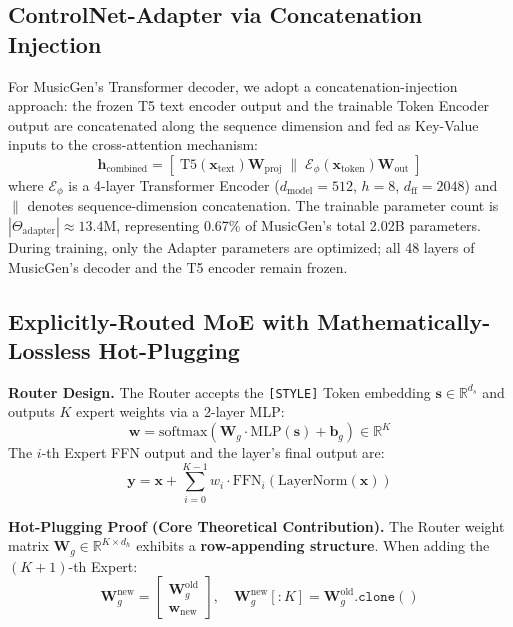 \documentclass[conference]{IEEEtran}
\begin{document}
\subsection{ControlNet-Adapter via Concatenation Injection}

For MusicGen's Transformer decoder, we adopt a concatenation-injection approach: the frozen T5 text encoder output and the trainable Token Encoder output are concatenated along the sequence dimension and fed as Key-Value inputs to the cross-attention mechanism:
\begin{equation}
\mathbf{h}_{\text{combined}} = [\;\text{T5}(\mathbf{x}_{\text{text}})\mathbf{W}_{\text{proj}}\;\|\;
\mathcal{E}_{\phi}(\mathbf{x}_{\text{token}})\mathbf{W}_{\text{out}}\;]
\end{equation}
where $\mathcal{E}_{\phi}$ is a 4-layer Transformer Encoder ($d_{\text{model}}=512$, $h=8$, $d_{\text{ff}}=2048$) and $\|$ denotes sequence-dimension concatenation. The trainable parameter count is $|\Theta_{\text{adapter}}| \approx 13.4$M, representing 0.67\% of MusicGen's total 2.02B parameters. During training, only the Adapter parameters are optimized; all 48 layers of MusicGen's decoder and the T5 encoder remain frozen.

\subsection{Explicitly-Routed MoE with Mathematically-Lossless Hot-Plugging}

\textbf{Router Design.} The Router accepts the \texttt{[STYLE]} Token embedding $\mathbf{s} \in \mathbb{R}^{d_s}$ and outputs $K$ expert weights via a 2-layer MLP:
\begin{equation}
\mathbf{w} = \text{softmax}(\mathbf{W}_g \cdot \text{MLP}(\mathbf{s}) + \mathbf{b}_g) \in \mathbb{R}^{K}
\end{equation}
The $i$-th Expert FFN output and the layer's final output are:
\begin{equation}
\mathbf{y} = \mathbf{x} + \sum_{i=0}^{K-1} w_i \cdot \text{FFN}_i(\text{LayerNorm}(\mathbf{x}))
\end{equation}

\textbf{Hot-Plugging Proof (Core Theoretical Contribution).}
The Router weight matrix $\mathbf{W}_g \in \mathbb{R}^{K \times d_h}$ exhibits a \textbf{row-appending structure}. When adding the $(K+1)$-th Expert:
\begin{equation}
\mathbf{W}_g^{\text{new}} = \begin{bmatrix}
\mathbf{W}_g^{\text{old}} \\ \hline \mathbf{w}_{\text{new}}
\end{bmatrix},\quad
\mathbf{W}_g^{\text{new}}[:K] = \mathbf{W}_g^{\text{old}}.\texttt{clone}()
\label{eq:hotplug}
\end{equation}
\end{document}

